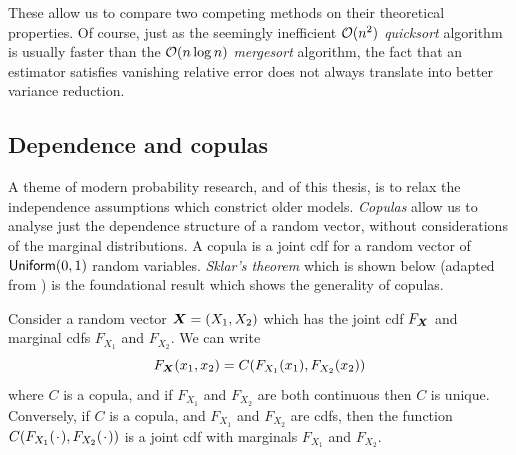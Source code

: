 These allow us to compare two competing methods on their theoretical properties. Of course, just as the seemingly inefficient ${\mathcal{O}}(n^2)$ \emph{quicksort} algorithm is usually faster than the ${\mathcal{O}}(n \log n)$ \emph{mergesort} algorithm, the fact that an estimator satisfies vanishing relative error does not always translate into better variance reduction.



\subsection{Dependence and copulas}

A theme of modern probability research, and of this thesis, is to relax the independence assumptions which constrict older models. \emph{Copulas} allow us to analyse just the dependence structure of a random vector, without considerations of the marginal distributions. A copula is a joint cdf for a random vector of $\mathsf{Uniform}(0,1)$ random variables. \emph{Sklar's theorem} which is shown below (adapted from \cite{nelsen2006introduction}) is the foundational result which shows the generality of copulas.

\begin{theorem}

Consider a random vector $\bm{X}=(X_1,X_2)$ which has the joint cdf $F_{\bm{X}}$ and marginal cdfs $F_{X_1}$ and $F_{X_2}$. We can write
\begin{equation} \label{copula_def}
F_{\bm{X}}(x_1, x_2) = C( F_{X_1}(x_1), F_{X_2}(x_2) )
\end{equation}
where $C$ is a copula, and if $F_{X_1}$ and $F_{X_2}$ are both continuous then $C$ is unique. Conversely, if $C$ is a copula, and $F_{X_1}$ and $F_{X_2}$ are cdfs, then the function $ C( F_{X_1}(\argdot), F_{X_2}(\argdot) )$ is a joint cdf with marginals $F_{X_1}$ and $F_{X_2}$.

\end{theorem}

